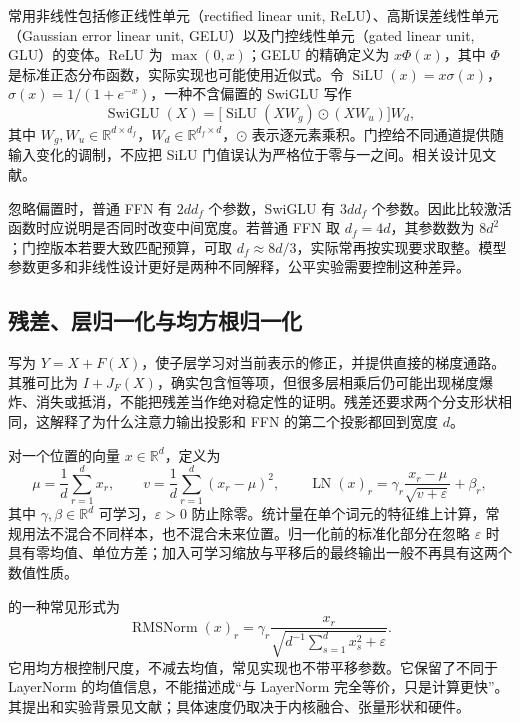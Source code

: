 \documentclass[UTF8,12pt,a4paper,fontset=fandol]{ctexart}
\begin{document}
常用非线性包括修正线性单元（rectified linear unit, ReLU）、高斯误差线性单元（Gaussian error linear unit, GELU）以及门控线性单元（gated linear unit, GLU）的变体。ReLU 为 $\max(0,x)$；GELU 的精确定义为 $x\Phi(x)$，其中 $\Phi$ 是标准正态分布函数，实际实现也可能使用近似式。令 $\operatorname{SiLU}(x)=x\sigma(x)$，$\sigma(x)=1/(1+e^{-x})$，一种不含偏置的 SwiGLU 写作
\begin{equation}
\operatorname{SwiGLU}(X)=
\bigl[\operatorname{SiLU}(XW_g)\odot(XW_u)\bigr]W_d,
\label{eq:tr-swiglu}
\end{equation}
其中 $W_g,W_u\in\mathbb R^{d\times d_f}$，$W_d\in\mathbb R^{d_f\times d}$，$\odot$ 表示逐元素乘积。门控给不同通道提供随输入变化的调制，不应把 SiLU 门值误认为严格位于零与一之间。相关设计见文献\cite{shazeer2020}。

忽略偏置时，普通 FFN 有 $2dd_f$ 个参数，SwiGLU 有 $3dd_f$ 个参数。因此比较激活函数时应说明是否同时改变中间宽度。若普通 FFN 取 $d_f=4d$，其参数数为 $8d^2$；门控版本若要大致匹配预算，可取 $d_f\approx8d/3$，实际常再按实现要求取整。模型参数更多和非线性设计更好是两种不同解释，公平实验需要控制这种差异。

\subsection{残差、层归一化与均方根归一化}

写为 $Y=X+F(X)$，使子层学习对当前表示的修正，并提供直接的梯度通路。其雅可比为 $I+J_F(X)$，确实包含恒等项，但很多层相乘后仍可能出现梯度爆炸、消失或抵消，不能把残差当作绝对稳定性的证明。残差还要求两个分支形状相同，这解释了为什么注意力输出投影和 FFN 的第二个投影都回到宽度 $d$。

对一个位置的向量 $x\in\mathbb R^d$，定义为
\begin{equation}
\mu=\frac1d\sum_{r=1}^d x_r,\qquad
v=\frac1d\sum_{r=1}^d(x_r-\mu)^2,\qquad
\operatorname{LN}(x)_r=\gamma_r\frac{x_r-\mu}{\sqrt{v+\varepsilon}}+\beta_r,
\label{eq:tr-ln}
\end{equation}
其中 $\gamma,\beta\in\mathbb R^d$ 可学习，$\varepsilon>0$ 防止除零。统计量在单个词元的特征维上计算，常规用法不混合不同样本，也不混合未来位置。归一化前的标准化部分在忽略 $\varepsilon$ 时具有零均值、单位方差；加入可学习缩放与平移后的最终输出一般不再具有这两个数值性质。

的一种常见形式为
\begin{equation}
\operatorname{RMSNorm}(x)_r=
\gamma_r\frac{x_r}{\sqrt{d^{-1}\sum_{s=1}^d x_s^2+\varepsilon}}.
\label{eq:tr-rms}
\end{equation}
它用均方根控制尺度，不减去均值，常见实现也不带平移参数。它保留了不同于 LayerNorm 的均值信息，不能描述成“与 LayerNorm 完全等价，只是计算更快”。其提出和实验背景见文献\cite{zhang2019}；具体速度仍取决于内核融合、张量形状和硬件。
\end{document}
